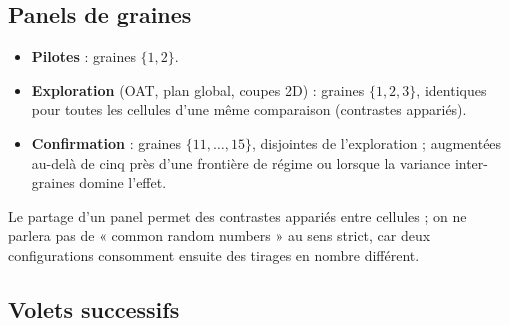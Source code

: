 \documentclass[11pt,a4paper]{article}
\begin{document}
\subsection{Panels de graines}

\begin{itemize}
\item \textbf{Pilotes} : graines $\{1,2\}$.
\item \textbf{Exploration} (OAT, plan global, coupes 2D) : graines
  $\{1,2,3\}$, identiques pour toutes les cellules d'une même comparaison
  (contrastes appariés).
\item \textbf{Confirmation} : graines $\{11,\dots,15\}$, disjointes de
  l'exploration ; augmentées au-delà de cinq près d'une frontière de
  régime ou lorsque la variance inter-graines domine l'effet.
\end{itemize}

Le partage d'un panel permet des contrastes appariés entre cellules ; on ne
parlera pas de « common random numbers » au sens strict, car deux
configurations consomment ensuite des tirages en nombre différent.

\subsection{Volets successifs}
\end{document}
